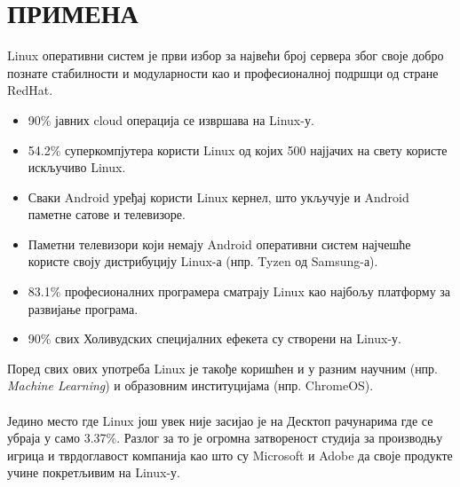 \documentclass[a4paper,14pt]{article}
\begin{document}
\section{ПРИМЕНА}
Linux оперативни систем је први избор за највећи број сервера због своје добро познате стабилности и модуларности као и професионалној подршци од стране RedHat\cite{redhat}.
\begin{itemize}
\item 90\% јавних cloud операција се извршава на Linux-у.
\item 54.2\% суперкомпјутера користи Linux од којих 500 најјачих на свету користе искључиво Linux.
\item Сваки Android уређај користи Linux кернел, што укључује и Android паметне сатове и телевизоре.
\item Паметни телевизори који немају Android оперативни систем најчешће користе своју дистрибуцију Linux-а (нпр. Tyzen од Samsung-а).
\item 83.1\% професионалних програмера сматрају Linux као најбољу платформу за развијање програма.
\item 90\% свих Холивудских специјалних ефекета су створени на Linux-у.
\end{itemize}
Поред свих ових употреба Linux је такође коришћен и у разним научним (нпр. \textit{Machine Learning}) и образовним институцијама (нпр. ChromeOS\cite{chromeos}).
\\\\
Једино место где Linux још увек није засијао је на Десктоп рачунарима где се убраја у само 3.37\%. Разлог за то је огромна затвореност студија за производњу игрица и тврдоглавост компанија као што су Microsoft и Adobe да своје продукте учине покретљивим на Linux-у.
\newpage
\end{document}
